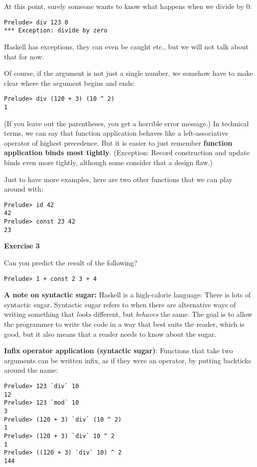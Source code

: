 \documentclass[11pt,
  american,
  DIV13]{article}
\begin{document}
At this point, surely someone wants to know what happens when we divide
by 0:

\begin{verbatim}
Prelude> div 123 0
*** Exception: divide by zero
\end{verbatim}

Haskell has exceptions, they can even be caught etc., but we will not
talk about that for now.

Of course, if the argument is not just a single number, we somehow have
to make clear where the argument begins and ends:

\begin{verbatim}
Prelude> div (120 + 3) (10 ^ 2)
1
\end{verbatim}

(If you leave out the parentheses, you get a horrible error message.) In
technical terms, we can say that function application behaves like a
left-associative operator of highest precedence. But it is easier to
just remember \textbf{function application binds most tightly}.
(Exception: Record construction and update binds even more tightly,
although some consider that a design flaw.)

Just to have more examples, here are two other functions that we can
play around with:

\begin{verbatim}
Prelude> id 42
42
Prelude> const 23 42
23
\end{verbatim}

\textbf{Exercise 3}

Can you predict the result of the following?

\begin{verbatim}
Prelude> 1 + const 2 3 + 4
\end{verbatim}

\textbf{A note on syntactic sugar:} Haskell is a high-calorie language:
There is lots of syntactic sugar. Syntactic sugar refers to when there
are alternative ways of writing something that \emph{looks} different,
but \emph{behaves} the same. The goal is to allow the programmer to
write the code in a way that best suits the reader, which is good, but
it also means that a reader needs to know about the sugar.

\textbf{Infix operator application (syntactic sugar)}: Functions that
take two arguments can be written infix, as if they were an operator, by
putting backticks around the name:

\begin{verbatim}
Prelude> 123 `div` 10
12
Prelude> 123 `mod` 10
3
Prelude> (120 + 3) `div` (10 ^ 2)
1
Prelude> (120 + 3) `div` 10 ^ 2
1
Prelude> ((120 + 3) `div` 10) ^ 2
144
\end{verbatim}
\end{document}
